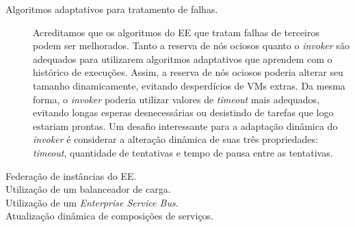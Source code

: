 \begin{description}
\item[Algoritmos adaptativos para tratamento de falhas.] 
Acreditamos que os algoritmos do EE que tratam falhas de terceiros podem ser melhorados.
Tanto a reserva de nós ociosos quanto o \emph{invoker} são adequados 
para utilizarem algoritmos adaptativos que aprendem com o histórico de
execuções. Assim, a reserva de nós ociosos poderia alterar seu tamanho dinamicamente,
evitando desperdícios de VMs extras. Da mesma forma, o \emph{invoker}
poderia utilizar valores de \emph{timeout} mais adequados, evitando longas
esperas desnecessárias ou desistindo de tarefas que logo estariam prontas.
Um desafio interessante para a adaptação dinâmica do \emph{invoker} é
considerar a alteração dinâmica de suas três propriedades:
\emph{timeout}, quantidade de tentativas e tempo de pausa entre as tentativas.

\item[Federação de instâncias do EE.]

\item[Utilização de um balanceador de carga.]

\item[Utilização de um \emph{Enterprise Service Bus}.]

\item[Atualização dinâmica de composições de serviços.]

\end{description}






